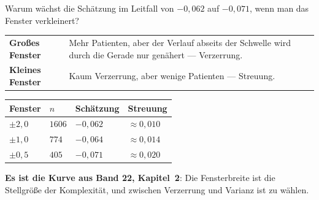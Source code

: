 \begin{aufgabe}
Warum wächst die Schätzung im Leitfall von $-0{,}062$ auf $-0{,}071$, wenn man das Fenster verkleinert?

\loesung
{}
\begin{center}
{\small
\renewcommand{\arraystretch}{1.5}
\begin{tabular}{@{}P{2.4cm}P{6.2cm}@{}}
\toprule
\textbf{Großes Fenster} & Mehr Patienten, aber der Verlauf abseits der Schwelle wird durch die Gerade nur genähert --- \textcolor{akzent}{Verzerrung}.\\
\textbf{Kleines Fenster} & Kaum Verzerrung, aber wenige Patienten --- \textcolor{akzent}{Streuung}.\\
\bottomrule
\end{tabular}}
\end{center}

\begin{center}
{\small
\renewcommand{\arraystretch}{1.46}
\begin{tabular}{@{}P{1.8cm}P{1.6cm}P{2.0cm}P{2.2cm}@{}}
\toprule
\textbf{Fenster} & $n$ & \textbf{Schätzung} & \textbf{Streuung}\\
\midrule
$\pm2{,}0$ & $1606$ & $-0{,}062$ & $\approx 0{,}010$\\
$\pm1{,}0$ & $774$ & $-0{,}064$ & $\approx 0{,}014$\\
$\pm0{,}5$ & $405$ & $-0{,}071$ & $\approx 0{,}020$\\
\bottomrule
\end{tabular}}
\end{center}

\begin{center}
\begin{minipage}{0.88\textwidth}
\end{minipage}
\end{center}

\begin{center}
\begin{minipage}{0.9\textwidth}
\textbf{Es ist die Kurve aus Band 22, Kapitel~2}: Die Fensterbreite ist die Stellgröße der Komplexität, und zwischen Verzerrung und Varianz ist zu wählen.
\end{minipage}
\end{center}
\end{aufgabe}

